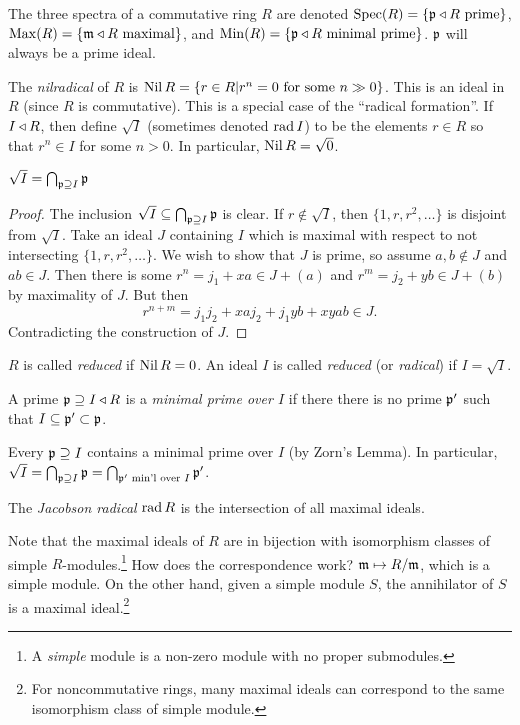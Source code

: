  \setcounter{lecture}{3}


 The three spectra of a commutative ring $R$ are denoted $\operatorname{Spec}(R) = \{\mathfrak{p}\triangleleft R \text{
 prime}\}$, $\operatorname{Max}(R) = \{\mathfrak{m}\triangleleft R\text{ maximal}\}$, and $\operatorname{Min}(R) = \{\mathfrak{p}\triangleleft R \text{ minimal
 prime}\}$. $\mathfrak{p}$ will always be a prime ideal.

 The \emph{nilradical} of $R$ is $\operatorname{Nil}{R}=\{r\in R| r^n=0 \text{ for some }n\gg 0\}$.
 This is an ideal in $R$ (since $R$ is commutative). This is a special case of the
 ``radical formation''. If $I\triangleleft R$, then define $\sqrt{I}$ (sometimes denoted $\operatorname{rad} I$)
 to be the elements $r\in R$ so that $r^n\in I$ for some $n>0$.  In particular, $\operatorname{Nil} R =
 \sqrt 0$.

 \begin{lemma}
   $\sqrt{I} = \bigcap_{\mathfrak{p} \supseteq I}\mathfrak{p}$
 \end{lemma}
 \begin{proof}
   The inclusion $\sqrt I \subseteq \bigcap_{\mathfrak{p} \supseteq I}\mathfrak{p}$ is clear. If $r\not\in
   \sqrt{I}$, then $\{1,r,r^2,\dots\}$ is disjoint from $\sqrt I$. Take an ideal $J$
   containing $I$ which is maximal with respect to not intersecting $\{1,r,r^2,\dots\}$.
   We wish to show that $J$ is prime, so assume $a,b\not\in J$ and $ab\in J$. Then there
   is some $r^n= j_1 + xa \in J+(a)$ and $r^m = j_2+yb\in J+(b)$ by maximality of $J$.
   But then
   \[
    r^{n+m} = j_1j_2 + xaj_2 + j_1yb + xyab \in J.
   \]
   Contradicting the construction of $J$.
 \end{proof}
 \begin{definition}
   $R$ is called \emph{reduced} if $\operatorname{Nil} R=0$. An ideal $I$ is called \emph{reduced} (or
   \emph{radical}) if $I=\sqrt I$.
 \end{definition}

 \begin{definition}
   A prime $\mathfrak{p}\supseteq I\triangleleft R$ is a \emph{minimal prime over $I$} if there there is no
   prime $\mathfrak{p}'$ such that $I\subseteq \mathfrak{p}'\subset \mathfrak{p}$.
 \end{definition}
 Every $\mathfrak{p}\supseteq I$ contains a minimal prime over $I$ (by Zorn's Lemma). In
 particular, $\sqrt I = \bigcap_{\mathfrak{p}\supseteq I}\mathfrak{p} = \bigcap_{\mathfrak{p}'\text{ min'l over } I}
 \mathfrak{p}'$.

 \begin{definition}
   The \emph{Jacobson radical} $\operatorname{rad} R$ is the intersection of all maximal ideals.
 \end{definition}
 Note that the maximal ideals of $R$ are in bijection with isomorphism classes of simple
 $R$-modules.\footnote{A \emph{simple} module is a non-zero module with no proper
 submodules.} How does the correspondence work? $\mathfrak{m}\mapsto R/\mathfrak{m}$, which is a simple
 module. On the other hand, given a simple module $S$, the annihilator of $S$ is a
 maximal ideal.\footnote{For noncommutative rings, many maximal ideals can correspond to
 the same isomorphism class of simple module.}

